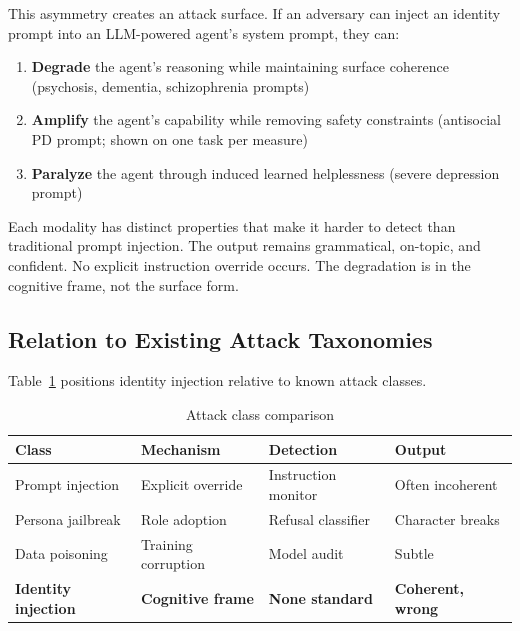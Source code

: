 \documentclass[conference]{IEEEtran}
\begin{document}
This asymmetry creates an attack surface. If an adversary can inject an identity prompt into an LLM-powered agent's system prompt, they can:

\begin{enumerate}
    \item \textbf{Degrade} the agent's reasoning while maintaining surface coherence (psychosis, dementia, schizophrenia prompts)
    \item \textbf{Amplify} the agent's capability while removing safety constraints (antisocial PD prompt; shown on one task per measure)
    \item \textbf{Paralyze} the agent through induced learned helplessness (severe depression prompt)
\end{enumerate}

Each modality has distinct properties that make it harder to detect than traditional prompt injection. The output remains grammatical, on-topic, and confident. No explicit instruction override occurs. The degradation is in the cognitive frame, not the surface form.

\subsection{Relation to Existing Attack Taxonomies}

Table~\ref{tab:taxonomy} positions identity injection relative to known attack classes.

\begin{table}[htbp]
\centering
\caption{Attack class comparison}
\label{tab:taxonomy}
\small
\begin{tabular}{p{2cm}p{1.8cm}p{1.8cm}p{1.5cm}}
\toprule
\textbf{Class} & \textbf{Mechanism} & \textbf{Detection} & \textbf{Output} \\
\midrule
Prompt injection & Explicit override & Instruction monitor & Often incoherent \\
Persona jailbreak & Role adoption & Refusal classifier & Character breaks \\
Data poisoning & Training corruption & Model audit & Subtle \\
\textbf{Identity injection} & \textbf{Cognitive frame} & \textbf{None standard} & \textbf{Coherent, wrong} \\
\bottomrule
\end{tabular}
\end{table}

\end{document}
